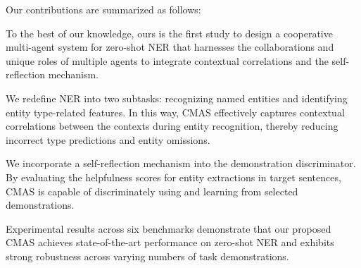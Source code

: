 Our contributions are summarized as follows:
\begin{enumerate*}[label=(\roman*),nosep,leftmargin=*]
    \item To the best of our knowledge, ours is the first study to design a cooperative multi-agent system for zero-shot \ac{NER} that harnesses the collaborations and unique roles of multiple agents to integrate contextual correlations and the self-reflection mechanism.
    \item We redefine \ac{NER} into two subtasks: recognizing named entities and identifying entity type-related features. In this way, \ac{CMAS} effectively captures contextual correlations between the contexts during entity recognition, thereby reducing incorrect type predictions and entity omissions.
    \item We incorporate a self-reflection mechanism into the demonstration discriminator. By evaluating the helpfulness scores for entity extractions in target sentences, \ac{CMAS} is capable of discriminately using and learning from selected demonstrations.
    \item Experimental results across six benchmarks demonstrate that our proposed \ac{CMAS} achieves state-of-the-art performance on zero-shot \ac{NER}  and exhibits strong robustness across varying numbers of task demonstrations.
\end{enumerate*}














